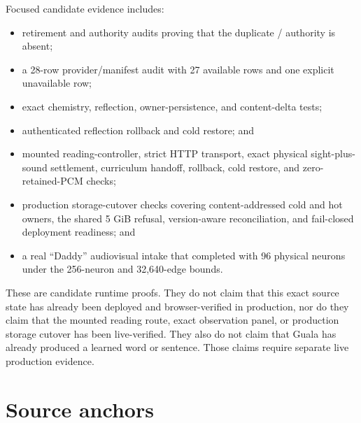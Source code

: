 \documentclass[11pt]{article}
\newcommand{\code}[1]{\texttt{\detokenize{#1}}}
\begin{document}
Focused candidate evidence includes:
\begin{itemize}
  \item retirement and authority audits proving that the duplicate
        \code{Embryo}/\code{SpikeBus} authority is absent;
  \item a 28-row provider/manifest audit with 27 available rows and one
        explicit unavailable row;
  \item exact chemistry, reflection, owner-persistence, and content-delta
        tests;
  \item authenticated reflection rollback and cold restore; and
  \item mounted reading-controller, strict HTTP transport, exact physical
        sight-plus-sound settlement, curriculum handoff, rollback, cold
        restore, and zero-retained-PCM checks;
  \item production storage-cutover checks covering content-addressed cold and
        hot owners, the shared 5 GiB refusal, version-aware reconciliation,
        and fail-closed deployment readiness; and
  \item a real ``Daddy'' audiovisual intake that completed with 96 physical
        neurons under the 256-neuron and 32,640-edge bounds.
\end{itemize}

These are candidate runtime proofs.  They do not claim that this exact source
state has already been deployed and browser-verified in production, nor do
they claim that the mounted reading route, exact observation panel, or
production storage cutover has been live-verified.  They also do not claim
that Guala has already produced a learned word or sentence.  Those claims
require separate live production evidence.

\section{Source anchors}
\end{document}

